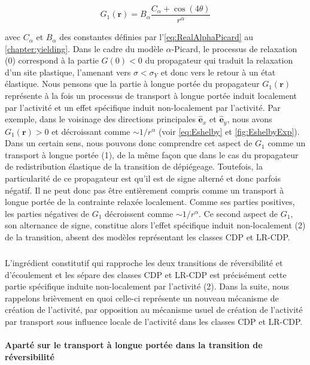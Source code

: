 \begin{equation}
	G_1(\mathbf{r}) = B_\alpha\frac{C_\alpha + \cos (4\theta)}{r^\alpha}
\end{equation}

\noindent avec $C_\alpha$ et $B_\alpha$ des constantes définies par l'\autoref{eq:RealAlphaPicard} au \autoref{chapter:yielding}. Dans le cadre du modèle $\alpha$-Picard, le processus de relaxation (0) correspond à la partie $G(0)<0$ du propagateur qui traduit la relaxation d'un site plastique, l'amenant vers $\sigma < \sigma_Y$ et donc vers le retour à un état élastique. Nous pensons que la partie à longue portée du propagateur $G_1(\mathbf{r})$ représente à la fois un processus de transport à longue portée induit localement par l'activité et un effet spécifique induit non-localement par l'activité. Par exemple, dans le voisinage des directions principales $\hat{\mathbf{e}}_x$ et $\hat{\mathbf{e}}_y$, nous avons $G_1(\mathbf{r})>0$ et décroissant comme $\sim 1/r^\alpha$ (voir \autoref{eq:Eshelby} et \autoref{fig:EshelbyExp}). Dans un certain sens, nous pouvons donc comprendre cet aspect de $G_1$ comme un transport à longue portée (1), de la même façon que dans le cas du propagateur de redistribution élastique de la transition de dépiégeage. Toutefois, la particularité de ce propagateur est qu'il est de signe alterné et donc parfois négatif. Il ne peut donc pas être entièrement compris comme un transport à longue portée de la contrainte relaxée localement. Comme ses parties positives, les parties négatives de $G_1$ décroissent comme $\sim 1/r^\alpha$. Ce second aspect de $G_1$, son alternance de signe, constitue alors l'effet spécifique induit non-localement (2) de la transition, absent des modèles représentant les classes CDP et LR-CDP.

\subparagraph{}L'ingrédient constitutif qui rapproche les deux transitions de réversibilité et d'écoulement et les sépare des classes CDP et LR-CDP est précisément cette partie spécifique induite non-localement par l'activité (2). Dans la suite, nous rappelons brièvement en quoi celle-ci représente un nouveau mécanisme de création de l'activité, par opposition au mécanisme usuel de création de l'activité par transport sous influence locale de l'activité dans les classes CDP et LR-CDP.

\paragraph{Aparté sur le transport à longue portée dans la transition de réversibilité}

